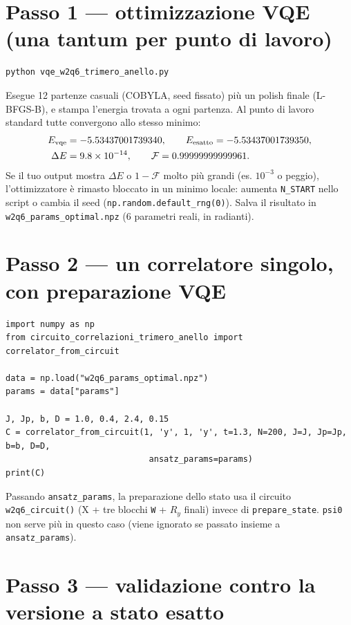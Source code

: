 \documentclass[11pt,a4paper]{article}
\begin{document}
\section*{Passo 1 --- ottimizzazione VQE (una tantum per punto di lavoro)}

\begin{verbatim}
python vqe_w2q6_trimero_anello.py
\end{verbatim}
Esegue 12 partenze casuali (COBYLA, seed fissato) più un polish finale
(L-BFGS-B), e stampa l'energia trovata a ogni partenza. Al punto di lavoro
standard tutte convergono allo stesso minimo:
\begin{align*}
E_{\rm vqe} &= -5.53437001739340, \qquad E_{\rm esatto} = -5.53437001739350,\\
\Delta E &= 9.8\times10^{-14}, \qquad \mathcal F = 0.99999999999961.
\end{align*}
Se il tuo output mostra $\Delta E$ o $1-\mathcal F$ molto più grandi (es.
$10^{-3}$ o peggio), l'ottimizzatore è rimasto bloccato in un minimo locale:
aumenta \texttt{N\_START} nello script o cambia il seed
(\texttt{np.random.default\_rng(0)}). Salva il risultato in
\texttt{w2q6\_params\_optimal.npz} (6 parametri reali, in radianti).

\section*{Passo 2 --- un correlatore singolo, con preparazione VQE}

\begin{verbatim}
import numpy as np
from circuito_correlazioni_trimero_anello import correlator_from_circuit

data = np.load("w2q6_params_optimal.npz")
params = data["params"]

J, Jp, b, D = 1.0, 0.4, 2.4, 0.15
C = correlator_from_circuit(1, 'y', 1, 'y', t=1.3, N=200, J=J, Jp=Jp, b=b, D=D,
                             ansatz_params=params)
print(C)
\end{verbatim}
Passando \texttt{ansatz\_params}, la preparazione dello stato usa il circuito
\texttt{w2q6\_circuit()} (X + tre blocchi \texttt{W} + $R_y$ finali) invece di
\texttt{prepare\_state}. \texttt{psi0} non serve più in questo caso (viene
ignorato se passato insieme a \texttt{ansatz\_params}).

\section*{Passo 3 --- validazione contro la versione a stato esatto}
\end{document}
